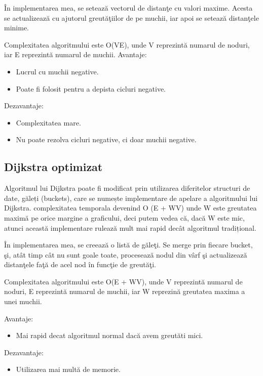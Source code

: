 \documentclass[runningheads]{llncs}
\begin{document}
\^{I}n implementarea mea, se seteaz\u{a} vectorul de distan\c{t}e cu valori maxime. Acesta se actualizeaz\u{a} cu ajutorul greut\u{a}\c{t}iilor de pe muchii, iar apoi se seteaz\u{a} distan\c{t}ele minime. 

Complexitatea algoritmului este O(VE), unde V reprezint\u{a} numarul de noduri, iar E reprezint\u{a} numarul de muchii.
\vspace{20pt}
Avantaje:
\begin{itemize}
	\item Lucrul cu muchii negative.
	\item Poate fi folosit pentru a depista cicluri negative.
\end{itemize}

Dezavantaje:
\begin{itemize}
	\item Complexitatea mare.
	\item Nu poate rezolva cicluri negative, ci doar muchii negative.
\end{itemize}

\subsection{Dijkstra optimizat}
\hspace{20px}Algoritmul lui Dijkstra poate fi modificat prin utilizarea diferitelor structuri de date, găleți (buckets), care se numește implementare de apelare a algoritmului lui Dijkstra. complexitatea temporala devenind O (E + WV) unde W este greutatea maximă pe orice margine a graficului, deci putem vedea că, dacă W este mic, atunci această implementare rulează mult mai rapid decât algoritmul tradițional.

\^{I}n implementarea mea, se creeaz\u{a} o list\u{a} de g\u{a}le\c{t}i. Se merge prin fiecare bucket, \c{s}i, at\^{a}t timp c\^{a}t nu sunt goale toate, proceseaz\u{a} nodul din v\^{a}rf \c{s}i actualizeaz\u{a} distan\c{t}ele fa\c{t}\u{a} de acel nod \^{i}n func\c{t}ie de greut\u{a}\c{t}i.

Complexitatea algoritmului este O(E + WV), unde V reprezint\u{a} numarul de noduri, E reprezint\u{a} numarul de muchii, iar W reprezin\u{a} greutatea maxima a unei muchii.

Avantaje:
\begin{itemize}
	\item Mai rapid decat algoritmul normal dac\u{a} avem greut\u{a}ti mici.
\end{itemize}

Dezavantaje:
\begin{itemize}
	\item Utilizarea mai mult\u{a} de memorie.
\end{itemize}
\end{document}
